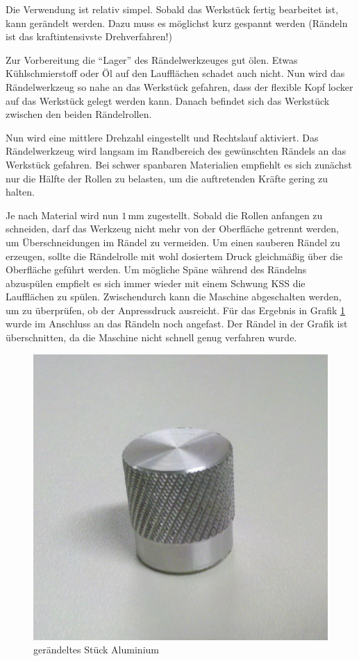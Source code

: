\documentclass{\basedir/fablab-document}
\begin{document}
Die Verwendung ist relativ simpel.
Sobald das Werkstück fertig bearbeitet ist, kann gerändelt werden.
Dazu muss es möglichst kurz gespannt werden (Rändeln ist das kraftintensivste Drehverfahren!)

Zur Vorbereitung die \enquote{Lager} des Rändelwerkzeuges gut ölen.
Etwas Kühlschmierstoff oder Öl auf den Laufflächen schadet auch nicht. 
Nun wird das Rändelwerkzeug so nahe an das Werkstück gefahren, dass der flexible Kopf locker auf das Werkstück gelegt werden kann.
Danach befindet sich das Werkstück zwischen den beiden Rändelrollen.

Nun wird eine mittlere Drehzahl eingestellt und Rechtslauf aktiviert. 
Das Rändelwerkzeug wird langsam im Randbereich des gewünschten Rändels an das Werkstück gefahren. 
Bei schwer spanbaren Materialien empfiehlt es sich zunächst nur die Hälfte der Rollen zu belasten, um die auftretenden Kräfte gering zu halten.

Je nach Material wird nun $1$\,mm zugestellt. Sobald die Rollen anfangen zu schneiden, darf das Werkzeug nicht mehr von der Oberfläche getrennt werden, um Überschneidungen im Rändel zu vermeiden.
Um einen sauberen Rändel zu erzeugen, sollte die Rändelrolle mit wohl dosiertem Druck gleichmäßig über die Oberfläche geführt werden.
Um mögliche Späne während des Rändelns abzuspülen empfielt es sich immer wieder mit einem Schwung KSS die Laufflächen zu spülen.
Zwischendurch kann die Maschine abgeschalten werden, um zu überprüfen, ob der Anpressdruck ausreicht.
Für das Ergebnis in Grafik \ref{fig:raendel} wurde im Anschluss an das Rändeln noch angefast.
Der Rändel in der Grafik ist überschnitten, da die Maschine nicht schnell genug verfahren wurde.

\begin{figure}[hb]
\caption{gerändeltes Stück Aluminium}
\label{fig:raendel}
\centering
\includegraphics[width=.5\linewidth]{img/raendel}
\end{figure}
\newpage
\end{document}
